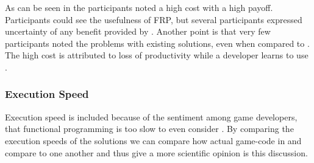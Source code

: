 As can be seen in  the participants noted a high cost with a high payoff. Participants could see the usefulness of \gls{FRP}, but several participants expressed uncertainty of any benefit provided by \fsh. Another point is that very few participants noted the problems with existing solutions, even when compared to \fsh. The high cost is attributed to loss of productivity while a developer learns to use \fsh.


\subsubsection{Execution Speed}
Execution speed is included because of the sentiment among game developers, that functional programming is too slow to even consider \cite{pop:functional:slow, pop:functional:sucks}. By comparing the execution speeds of the solutions we can compare how actual game-code in \csh and \fsh compare to one another and thus give a more scientific opinion is this discussion.
